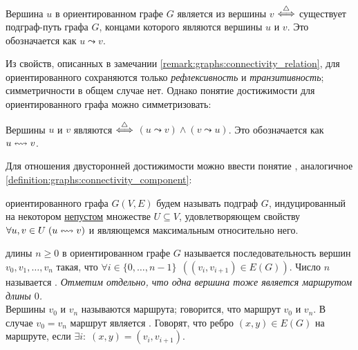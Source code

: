 \begin{definition}
    Вершина $ u $ в ориентированном графе $ G $ является  из вершины $ v $ $ \overset{\triangle}{\Longleftrightarrow} $ существует подграф-путь графа $ G $,
    концами которого являются вершины $ u $ и $ v $.
    Это обозначается как $ u \leadsto v $.
\end{definition}

Из свойств, описанных в замечании \ref{remark:graphs:connectivity_relation},
для ориентированного сохраняются только \emph{рефлексивность} и \emph{транзитивность};
симметричности в общем случае нет.
Однако понятие достижимости для ориентированного графа можно симметризовать:

\begin{definition}
    Вершины $ u $ и $ v $ являются  $ \overset{\triangle}{\Longleftrightarrow} $ $ (u \leadsto v) \wedge (v \leadsto u) $.
    Это обозначается как $ u \leftrightsquigarrow v $.
\end{definition}

Для отношения двусторонней достижимости можно ввести понятие , аналогичное \ref{definition:graphs:connectivity_component}:

\begin{definition}
    \label{definition:oriented_graphs:strong_connectivity_component}
     ориентированного графа $ G(V, E) $ будем называть подграф $ G $,
    индуцированный на некотором \underline{непустом} множестве $ U \subseteq V $,
    удовлетворяющем свойству $ \forall u, v \in U \; (u \leftrightsquigarrow v) $ и являющемся максимальным относительно него.
\end{definition}

\begin{definition}
     длины $ n \geqslant 0 $ в ориентированном графе $ G $ называется последовательность вершин $ v_0, v_1, \ldots, v_n $ такая,
    что $ \forall i \in \{ 0, \ldots, n-1 \} \;\, \left( (v_i, v_{i+1}) \in E(G) \right) $.
    \newline
    Число $ n $ называется .
    \textit{Отметим отдельно, что одна вершина тоже является маршрутом длины $ 0 $.}
    \\[0.25\baselineskip]
    Вершины $ v_0 $ и $ v_n $ называются  маршрута;
    говорится, что маршрут  $ v_0 $ и $ v_n $.
    В случае $ v_0 = v_n $ маршрут является .
    \newline
    Говорят, что ребро $ (x, y) \in E(G) $  на маршруте, если $ \exists i: \; (x, y) = (v_i, v_{i+1}) $.
\end{definition}


